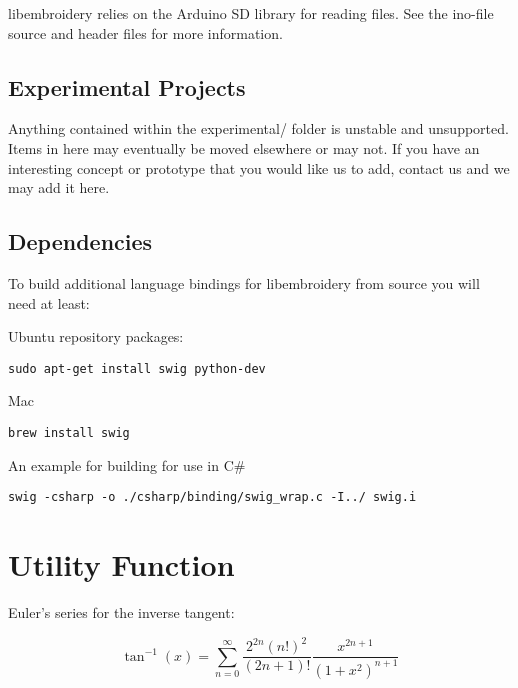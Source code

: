 \documentclass[onesize, a4paper]{refart}
\begin{document}
libembroidery relies on the Arduino SD library for reading files. See
the ino-file source and header files for more information.

\subsection{Experimental Projects}

Anything contained within the experimental/ folder is unstable and
unsupported. Items in here may eventually be moved elsewhere or may not.
If you have an interesting concept or prototype that you would like us
to add, contact us and we may add it here.

\subsection{Dependencies}

To build additional language bindings for libembroidery from source you
will need at least:

Ubuntu repository packages:

\begin{verbatim}
sudo apt-get install swig python-dev
\end{verbatim}

Mac

\begin{verbatim}
brew install swig
\end{verbatim}

An example for building for use in C\#

\begin{verbatim}
swig -csharp -o ./csharp/binding/swig_wrap.c -I../ swig.i
\end{verbatim}

\section{Utility Function}

Euler's series for the inverse tangent\cite{Chien-Lih2005}:

\begin{equation}
\tan^{-1}(x) = \sum_{n=0}^{\infty} \frac{2^{2n}(n!)^{2}}{(2n+1)!} \frac{x^{2n+1}}{(1+x^{2})^{n+1}}
\end{equation}

\newpage




\newpage

\section{}
\end{document}
